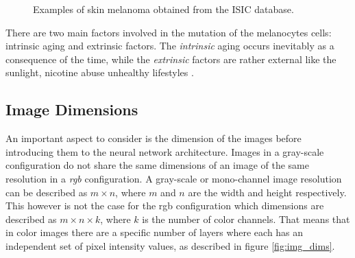 \begin{figure}[h]
  \centering
  \hspace{-0.4cm}
  \caption{Examples of skin melanoma obtained from the ISIC \citep{isic_skin} database.}
\end{figure}

There are two main factors involved in the mutation of the melanocytes cells: intrinsic aging and extrinsic factors. The \emph{intrinsic} aging occurs inevitably as a consequence of the time, while the \emph{extrinsic} factors are rather external like the sunlight, nicotine abuse unhealthy lifestyles \citep{farage2008intrinsic}.

\subsection{Image Dimensions}
An important aspect to consider is the dimension of the images before introducing them to the neural network architecture. Images in a gray-scale configuration do not share the same dimensions of an image of the same resolution in a \emph{rgb} configuration. A gray-scale or mono-channel image resolution can be described as $m \times n$, where $m$ and $n$ are the width and height respectively. This however is not the case for the rgb configuration which dimensions are described as $m \times n \times k$, where $k$ is the number of color channels. That means that in color images there are a specific number of layers where each has an independent set of pixel intensity values, as described in figure \ref{fig:img_dims}.


